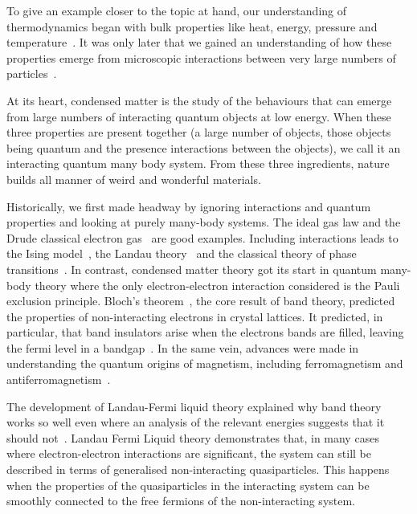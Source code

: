 To give an example closer to the topic at hand, our understanding of thermodynamics began with bulk properties like heat, energy, pressure and temperature~\autocite{saslowHistoryThermodynamicsMissing2020}. It was only later that we gained an understanding of how these properties emerge from microscopic interactions between very large numbers of particles~\autocite{flammHistoryOutlookStatistical1998}.

At its heart, condensed matter is the study of the behaviours that can emerge from large numbers of interacting quantum objects at low energy. When these three properties are present together (a large number of objects, those objects being quantum and the presence interactions between the objects), we call it an interacting quantum many body system. From these three ingredients, nature builds all manner of weird and wonderful materials.

Historically, we first made headway by ignoring interactions and quantum properties and looking at purely many-body systems. The ideal gas law and the Drude classical electron gas~\autocite{ashcroftSolidStatePhysics1976} are good examples. Including interactions leads to the Ising model~\autocite{isingBeitragZurTheorie1925}, the Landau theory~\autocite{landauTheoryPhaseTransitions1937} and the classical theory of phase transitions~\autocite{jaegerEhrenfestClassificationPhase1998}. In contrast, condensed matter theory got its start in quantum many-body theory where the only electron-electron interaction considered is the Pauli exclusion principle. Bloch's theorem~\autocite{blochÜberQuantenmechanikElektronen1929}, the core result of band theory, predicted the properties of non-interacting electrons in crystal lattices. It predicted, in particular, that band insulators arise when the electrons bands are filled, leaving the fermi level in a bandgap~\autocite{ashcroftSolidStatePhysics1976}. In the same vein, advances were made in understanding the quantum origins of magnetism, including ferromagnetism and antiferromagnetism~\autocite{MagnetismCondensedMatter}.

The development of Landau-Fermi liquid theory explained why band theory works so well even where an analysis of the relevant energies suggests that it should not~\autocite{wenQuantumFieldTheory2007}. Landau Fermi Liquid theory demonstrates that, in many cases where electron-electron interactions are significant, the system can still be described in terms of generalised non-interacting quasiparticles. This happens when the properties of the quasiparticles in the interacting system can be smoothly connected to the free fermions of the non-interacting system.

